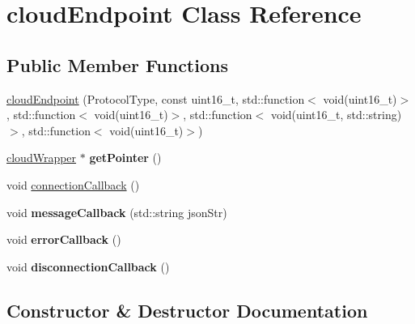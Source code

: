 \hypertarget{classcloudEndpoint}{}\section{cloud\+Endpoint Class Reference}
\label{classcloudEndpoint}
\subsection*{Public Member Functions}
\begin{DoxyCompactItemize}
\item 
\hyperlink{classcloudEndpoint_a40ec5e6eb89de4b41b5406af874226e9}{cloud\+Endpoint} (Protocol\+Type, const uint16\+\_\+t, std\+::function$<$ void(uint16\+\_\+t)$>$, std\+::function$<$ void(uint16\+\_\+t)$>$, std\+::function$<$ void(uint16\+\_\+t, std\+::string)$>$, std\+::function$<$ void(uint16\+\_\+t)$>$)
\item 
\hyperlink{classcloudWrapper}{cloud\+Wrapper} $\ast$ {\bfseries get\+Pointer} ()\hypertarget{classcloudEndpoint_a063ff95f5c56f2651e1a7c028844a500}{}\label{classcloudEndpoint_a063ff95f5c56f2651e1a7c028844a500}

\item 
void \hyperlink{classcloudEndpoint_aa111be2328e6a0e697a58a0056cb770d}{connection\+Callback} ()
\item 
void {\bfseries message\+Callback} (std\+::string json\+Str)\hypertarget{classcloudEndpoint_ace3d5b0514f6481e62cb279f7cbcab24}{}\label{classcloudEndpoint_ace3d5b0514f6481e62cb279f7cbcab24}

\item 
void {\bfseries error\+Callback} ()\hypertarget{classcloudEndpoint_a603f9551764cb9149df96e338346f727}{}\label{classcloudEndpoint_a603f9551764cb9149df96e338346f727}

\item 
void {\bfseries disconnection\+Callback} ()\hypertarget{classcloudEndpoint_aea0abf711179f326a9e5631b80a9b720}{}\label{classcloudEndpoint_aea0abf711179f326a9e5631b80a9b720}

\end{DoxyCompactItemize}


\subsection{Constructor \& Destructor Documentation}
